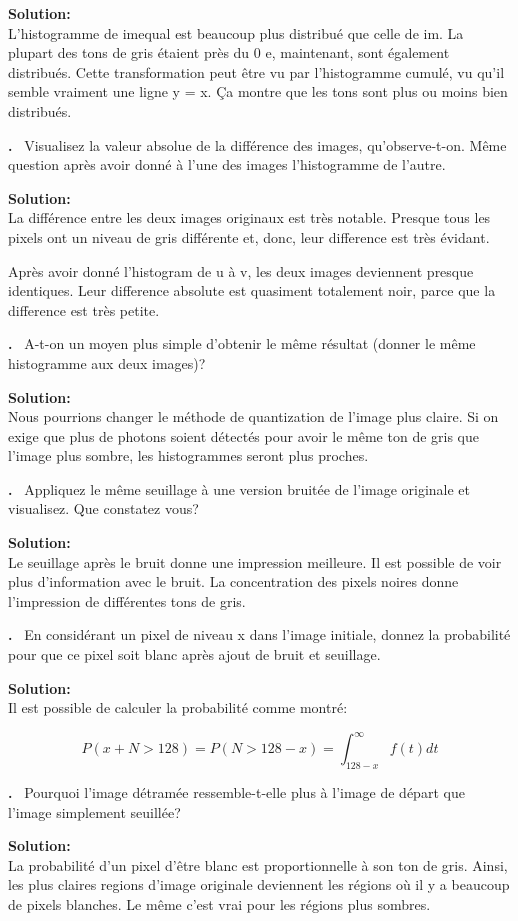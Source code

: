 \documentclass{article}
\newcounter{problem}
\newcounter{solution}
\newcommand\Problem{%
  \stepcounter{problem}%
  \textbf{\theproblem.}~%
  \setcounter{solution}{0}%
}
\newcommand\Solution{%
  \textbf{Solution:}\\%
}
\begin{document}
\Solution L'histogramme de imequal est beaucoup plus distribué que celle de im. La plupart des tons de gris étaient près du 0 e, maintenant, sont également distribués. Cette transformation peut être vu par l'histogramme cumulé, vu qu'il semble vraiment une ligne y = x. Ça montre que les tons sont plus ou moins bien distribués.

\Problem Visualisez la valeur absolue de la différence des images, qu'observe-t-on. Même question après avoir donné à l'une des images l'histogramme de l'autre.

\Solution La différence entre les deux images originaux est très notable. Presque tous les pixels ont un niveau de gris différente et, donc, leur difference est très évidant.

Après avoir donné l'histogram de u à v, les deux images deviennent presque identiques. Leur difference absolute est quasiment totalement noir, parce que la difference est très petite.

\Problem A-t-on un moyen plus simple d'obtenir le même résultat (donner le même histogramme aux deux images)?

\Solution Nous pourrions changer le méthode de quantization de l'image plus claire. Si on exige que plus de photons soient détectés pour avoir le même ton de gris que l'image plus sombre, les histogrammes seront plus proches.

\Problem Appliquez le même seuillage à une version bruitée de l'image originale et visualisez. Que constatez vous?

\Solution Le seuillage après le bruit donne une impression meilleure. Il est possible de voir plus d'information avec le bruit. La concentration des pixels noires donne l'impression de différentes tons de gris.

\Problem En considérant un pixel de niveau x dans l'image initiale, donnez la probabilité pour que ce pixel soit blanc après ajout de bruit et seuillage.

\Solution Il est possible de calculer la probabilité comme montré:

\begin{equation*}
P(x + N > 128) = P(N > 128 - x) = \int_{128 - x}^{\infty} f(t) dt
\end{equation*}

\Problem Pourquoi l'image détramée ressemble-t-elle plus à l'image de départ que l'image simplement seuillée?

\Solution La probabilité d'un pixel d'être blanc est proportionnelle à son ton de gris. Ainsi, les plus claires regions d'image originale deviennent les régions où il y a beaucoup de pixels blanches. Le même c'est vrai pour les régions plus sombres.
\end{document}
